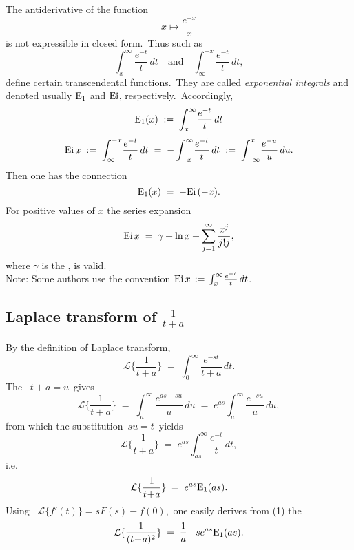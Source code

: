 \documentclass[12pt]{article}
\theoremstyle{definition}
\begin{document}
The antiderivative of the function
$$x \mapsto \frac{e^{-x}}{x}$$
is not expressible in closed form.\, Thus such  as
$$\int_x^\infty\!\frac{e^{-t}}{t}\,dt \quad \mbox{and} \quad \int_\infty^{-x}\!\frac{e^{-t}}{t}\,dt,$$
define certain  transcendental functions.\, They are called \emph{exponential integrals} and denoted usually
${\rm E}_1$ and ${\rm Ei}$, respectively.\, Accordingly,
$${\rm E}_1(x) \;:=\; \int_x^\infty\!\frac{e^{-t}}{t}\,dt$$
$${\rm Ei}\,x \;:=\; \int_\infty^{-x}\!\frac{e^{-t}}{t}\,dt \;=\; -\int_{-x}^\infty\!\frac{e^{-t}}{t}\,dt
\;:=\; \int_{-\infty}^x\!\frac{e^{-u}}{u}\,du.$$
Then one has the connection
$${\rm E}_1(x) \;=\; -{\rm Ei}\,(-x).$$
For positive values of $x$ the series expansion
$${\rm Ei}\,x \;=\; \gamma+\ln{x}+\sum_{j=1}^\infty\frac{x^j}{j!j},$$
where $\gamma$ is the , is valid.\\

Note: Some authors use the convention\; ${\rm Ei}\,x \,:=\, \int_x^\infty\!\frac{e^{-t}}{t}\,dt$.\\

\subsection{Laplace transform of $\frac{1}{t+a}$}

By the definition of Laplace transform,
$$\mathcal{L}\{\frac{1}{t\!+\!a}\} \;=\; \int_0^\infty\frac{e^{-st}}{t\!+\!a}\,dt.$$
The \, $t\!+\!a = u$\, gives
$$\mathcal{L}\{\frac{1}{t\!+\!a}\} \;=\; \int_a^\infty\frac{e^{as-su}}{u}\,du 
\;=\; e^{as}\int_a^\infty\frac{e^{-su}}{u}\,du,$$
from which the substitution\, $su = t$\, yields
$$\mathcal{L}\{\frac{1}{t\!+\!a}\} \;=\; e^{as}\int_{as}^\infty\frac{e^{-t}}{t}\,dt,$$
i.e. 
\begin{align}
\mathcal{L}\{\frac{1}{t\!+\!a}\} \;=\; e^{as}{\rm E}_1(as).
\end{align}
Using \, $\mathcal{L}\{f'(t)\} = sF(s)\!-\!f(0)$,\, one easily derives from (1) the 
\begin{align}
\mathcal{L}\{\frac{1}{(t\!+\!a)^2}\} \;=\; \frac{1}{a}\!-\!se^{as}{\rm E}_1(as).
\end{align}




\end{document}
